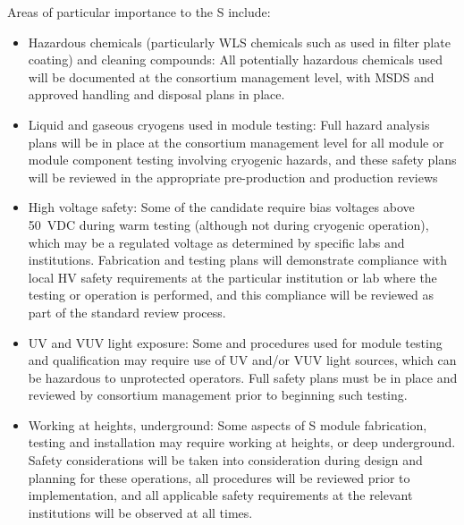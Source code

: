 Areas of particular importance to the S include:
\begin{itemize}
\item Hazardous chemicals (particularly WLS chemicals such as  used in filter plate coating) and cleaning compounds:  All potentially hazardous chemicals used will be documented at the consortium management level, with MSDS and approved handling and disposal plans in place.

\item Liquid and gaseous cryogens used in module testing:  Full hazard analysis plans will be in place at the consortium management level for all module or module component testing involving cryogenic hazards, and these safety plans will be reviewed in the appropriate pre-production and production reviews

\item High voltage safety:  Some of the candidate  require bias voltages above \SI{50}{VDC} during warm testing (although not during cryogenic operation), which may be a regulated voltage as determined by specific labs and institutions.  Fabrication and testing plans will demonstrate compliance with local HV safety requirements at the particular institution or lab where the testing or operation is performed, and this compliance will be reviewed as part of the standard review process.

\item UV and VUV light exposure:  Some  and  procedures used for module testing and qualification may require use of UV and/or VUV light sources, which can be hazardous  to unprotected operators.  Full safety plans must be in place and reviewed by consortium management prior to beginning such testing.

\item Working at heights, underground:  Some aspects of S module fabrication, testing and installation may require working at heights, or deep underground.  Safety considerations will be taken into consideration during design and planning for these operations, all procedures will be reviewed prior to implementation, and all applicable safety requirements at the relevant institutions will be observed at all times.

\end{itemize}
